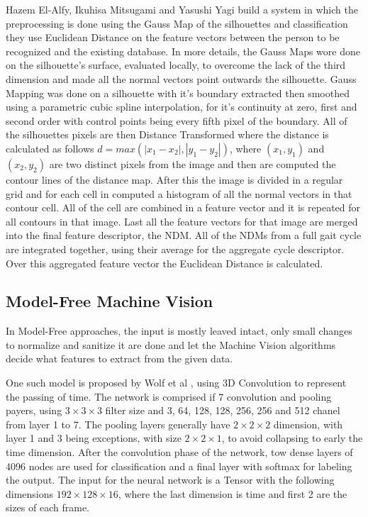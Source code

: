 \documentclass[12pt]{article}
\theoremstyle{definition}
\begin{document}
	Hazem El-Alfy, Ikuhisa Mitsugami and Yasushi Yagi \cite{gait-with-curvature-map} build a system in which the preprocessing is done using the Gauss Map of the silhouettes and classification they use Euclidean Distance on the feature vectors between the person to be recognized and the existing database. In more details, the Gauss Maps wore done on the silhouette's surface, evaluated locally, to overcome the lack of the third dimension and made all the normal vectors point outwards the silhouette. Gauss Mapping was done on a silhouette with it's boundary extracted then smoothed using a parametric cubic spline interpolation, for it's continuity at zero, first and second order with control points being every fifth pixel of the boundary. All of the silhouettes pixels are then Distance Transformed where the distance is calculated as follows $d=max(|x_1-x_2|, |y_1-y_2|)$, where $(x_1, y_1)$ and $(x_2, y_2)$ are two distinct pixels from the image and then are computed the contour lines of the distance map. After this the image is divided in a regular grid and for each cell in computed a histogram of all the normal vectors in that contour cell. All of the cell are combined in a feature vector and it is repeated for all contours in that image. Last all the feature vectors for that image are merged into the final feature descriptor, the NDM. All of the NDMs from a full gait cycle are integrated together, using their average for the aggregate cycle descriptor. Over this aggregated feature vector the Euclidean Distance is calculated.

	\subsection{Model-Free Machine Vision}

	In Model-Free approaches, the input is mostly leaved intact, only small changes to normalize and sanitize it are done and let the Machine Vision algorithms decide what features to extract from the given data.

	One such model is proposed by Wolf et al \cite{Wolf2016MultiviewGR}, using 3D Convolution to represent the passing of time. The network is comprised if 7 convolution and pooling payers, using $3 \times 3 \times 3$ filter size and 3, 64, 128, 128, 256, 256 and 512 chanel from layer 1 to 7. The pooling layers generally have $2 \times 2 \times 2$ dimension, with layer 1 and 3 being exceptions, with size $2 \times 2 \times 1$, to avoid collapsing to early the time dimension. After the convolution phase of the network, tow dense layers of 4096 nodes are used for classification and a final layer with softmax for labeling the output. The input for the neural network is a Tensor with the following dimensions $192 \times 128 \times 16$, where the last dimension is time and first 2 are the sizes of each frame.
\end{document}
